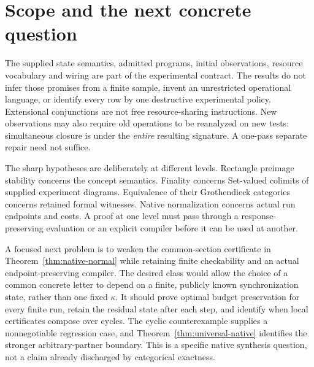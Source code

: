 \section{Scope and the next concrete question}\label{sec:limits}
The supplied state semantics, admitted programs, initial observations,
resource vocabulary and wiring are part of the experimental contract.
The results do not infer those promises from a finite sample, invent an
unrestricted operational language, or identify every row by one destructive
experimental policy. Extensional conjunctions are not free resource-sharing
instructions. New observations may also require old operations to be
reanalyzed on new tests: simultaneous closure is under the \emph{entire}
resulting signature. A one-pass separate repair need not suffice.

The sharp hypotheses are deliberately at different levels. Rectangle
preimage stability concerns the concept semantics. Finality concerns
Set-valued colimits of supplied experiment diagrams. Equivalence of their
Grothendieck categories concerns retained formal witnesses. Native
normalization concerns actual run endpoints and costs. A proof at one
level must pass through a response-preserving evaluation or an explicit
compiler before it can be used at another.

A focused next problem is to weaken the common-section certificate in
Theorem~\ref{thm:native-normal} while retaining finite checkability and an
actual endpoint-preserving compiler. The desired class would allow the
choice of a common concrete letter to depend on a finite, publicly known
synchronization state, rather than one fixed $\kappa$. It should prove
optimal budget preservation for every finite run, retain the residual
state after each step, and identify when local certificates compose over
cycles. The cyclic counterexample supplies a nonnegotiable regression
case, and Theorem~\ref{thm:universal-native} identifies the stronger
arbitrary-partner boundary. This is a specific native synthesis question,
not a claim already discharged by categorical exactness.

